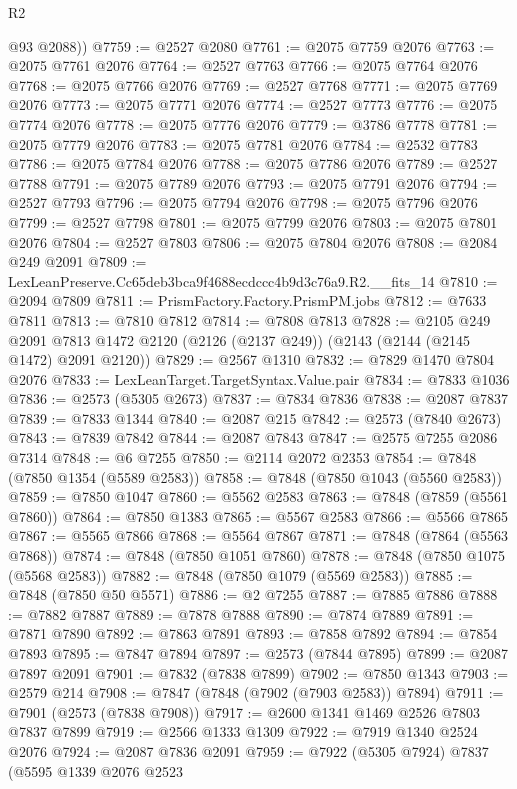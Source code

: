 \begin{lexlean}{R2}
\begin{coremodule}
        @93
        @2088))
@7759 := @2527 @2080
@7761 := @2075 @7759 @2076
@7763 := @2075 @7761 @2076
@7764 := @2527 @7763
@7766 := @2075 @7764 @2076
@7768 := @2075 @7766 @2076
@7769 := @2527 @7768
@7771 := @2075 @7769 @2076
@7773 := @2075 @7771 @2076
@7774 := @2527 @7773
@7776 := @2075 @7774 @2076
@7778 := @2075 @7776 @2076
@7779 := @3786 @7778
@7781 := @2075 @7779 @2076
@7783 := @2075 @7781 @2076
@7784 := @2532 @7783
@7786 := @2075 @7784 @2076
@7788 := @2075 @7786 @2076
@7789 := @2527 @7788
@7791 := @2075 @7789 @2076
@7793 := @2075 @7791 @2076
@7794 := @2527 @7793
@7796 := @2075 @7794 @2076
@7798 := @2075 @7796 @2076
@7799 := @2527 @7798
@7801 := @2075 @7799 @2076
@7803 := @2075 @7801 @2076
@7804 := @2527 @7803
@7806 := @2075 @7804 @2076
@7808 := @2084 @249 @2091
@7809 := LexLeanPreserve.Cc65deb3bca9f4688ecdccc4b9d3c76a9.R2.__fits_14
@7810 := @2094 @7809
@7811 := PrismFactory.Factory.PrismPM.jobs
@7812 := @7633 @7811
@7813 := @7810 @7812
@7814 := @7808 @7813
@7828 := @2105
    @249
    @2091
    @7813
    @1472
    @2120
    (@2126 (@2137 @249))
    (@2143 (@2144 (@2145 @1472) @2091 @2120))
@7829 := @2567 @1310
@7832 := @7829 @1470 @7804 @2076
@7833 := LexLeanTarget.TargetSyntax.Value.pair
@7834 := @7833 @1036
@7836 := @2573 (@5305 @2673)
@7837 := @7834 @7836
@7838 := @2087 @7837
@7839 := @7833 @1344
@7840 := @2087 @215
@7842 := @2573 (@7840 @2673)
@7843 := @7839 @7842
@7844 := @2087 @7843
@7847 := @2575 @7255 @2086 @7314
@7848 := @6 @7255
@7850 := @2114 @2072 @2353
@7854 := @7848 (@7850 @1354 (@5589 @2583))
@7858 := @7848 (@7850 @1043 (@5560 @2583))
@7859 := @7850 @1047
@7860 := @5562 @2583
@7863 := @7848 (@7859 (@5561 @7860))
@7864 := @7850 @1383
@7865 := @5567 @2583
@7866 := @5566 @7865
@7867 := @5565 @7866
@7868 := @5564 @7867
@7871 := @7848 (@7864 (@5563 @7868))
@7874 := @7848 (@7850 @1051 @7860)
@7878 := @7848 (@7850 @1075 (@5568 @2583))
@7882 := @7848 (@7850 @1079 (@5569 @2583))
@7885 := @7848 (@7850 @50 @5571)
@7886 := @2 @7255
@7887 := @7885 @7886
@7888 := @7882 @7887
@7889 := @7878 @7888
@7890 := @7874 @7889
@7891 := @7871 @7890
@7892 := @7863 @7891
@7893 := @7858 @7892
@7894 := @7854 @7893
@7895 := @7847 @7894
@7897 := @2573 (@7844 @7895)
@7899 := @2087 @7897 @2091
@7901 := @7832 (@7838 @7899)
@7902 := @7850 @1343
@7903 := @2579 @214
@7908 := @7847 (@7848 (@7902 (@7903 @2583)) @7894)
@7911 := @7901 (@2573 (@7838 @7908))
@7917 := @2600 @1341 @1469 @2526 @7803 @7837 @7899
@7919 := @2566 @1333 @1309
@7922 := @7919 @1340 @2524 @2076
@7924 := @2087 @7836 @2091
@7959 := @7922
    (@5305 @7924)
    @7837
    (@5595
      @1339
      @2076
      @2523

\end{coremodule}
\end{lexlean}
